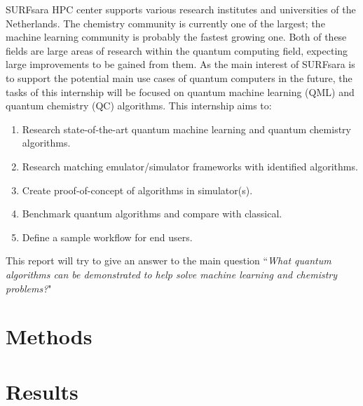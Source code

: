 \documentclass[a4paper]{article}
\begin{document}
SURFsara HPC center supports various research institutes and universities of the Netherlands.
The chemistry community is currently one of the largest; the machine learning community is probably the fastest growing one.
Both of these fields are large areas of research within the quantum computing field, expecting large improvements to be gained from them.
As the main interest of SURFsara is to support the potential main use cases of quantum computers in the future, the tasks of this internship will be focused on quantum machine learning (QML) and quantum chemistry (QC) algorithms.
This internship aims to:
\begin{enumerate}
	\item Research state-of-the-art quantum machine learning and quantum chemistry algorithms.
	\item Research matching emulator/simulator frameworks with identified algorithms.
	\item Create proof-of-concept of algorithms in simulator(s).
	\item Benchmark quantum algorithms and compare with classical.
	\item Define a sample workflow for end users.
\end{enumerate}

This report will try to give an answer to the main question ``\emph{What quantum algorithms can be demonstrated to help solve machine learning and chemistry problems?}"

\newpage

\section{Methods}

\section{Results}

\newpage

\printbibliography
\end{document}
